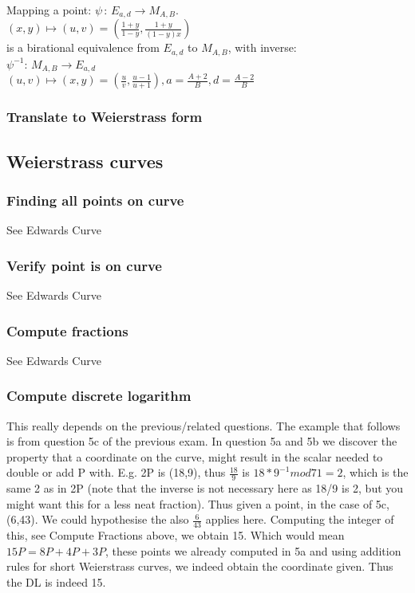 \documentclass{article}
\begin{document}
Mapping a point: $\psi\,:\,E_{a,d} \rightarrow M_{A,B}$.\\ 
$(x,y) \mapsto (u,v) = \left(\frac{1+y}{1-y},\frac{1+y}{(1-y)x}\right)$ \\

is a birational equivalence from $E_{a,d}$ to $M_{A,B}$, with inverse:\\
$\psi^{-1}$: $M_{A,B} \rightarrow E_{a,d}$ \\
$(u,v) \mapsto (x,y) = \left(\frac{u}{v},\frac{u-1}{u+1}\right),
a=\frac{A+2}{B}, d=\frac{A-2}{B}$



\subsubsection{Translate to Weierstrass form}

\subsection{Weierstrass curves}
\subsubsection{Finding all points on curve}
See Edwards Curve
\subsubsection{Verify point is on curve}
See Edwards Curve
\subsubsection{Compute fractions}
See Edwards Curve
\subsubsection{Compute discrete logarithm}
This really depends on the previous/related questions. The example that follows is from question 5c of the previous exam.
In question 5a and 5b we discover the property that a coordinate on the curve, might result in the scalar needed to double or add P with. E.g. 2P is (18,9), thus $\frac{18}{9}$ is $18*9^{-1} mod 71 = 2$, which is the same 2 as in 2P (note that the inverse is not necessary here as 18/9 is 2, but you might want this for a less neat fraction).
Thus given a point, in the case of 5c, (6,43). We could hypothesise the also $\frac{6}{43}$ applies here. Computing the integer of this, see Compute Fractions above, we obtain 15. Which would mean $15P = 8P + 4P + 3P$, these points we already computed in 5a and using addition rules for short Weierstrass curves, we indeed obtain the coordinate given. Thus the DL is indeed 15.
\end{document}
